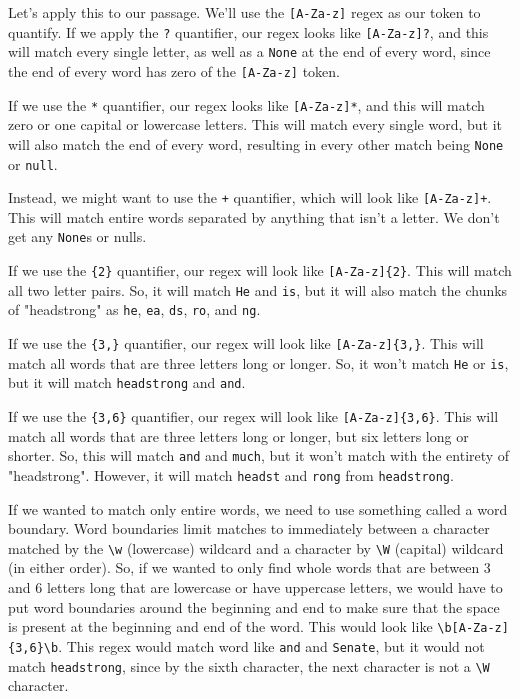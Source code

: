 Let's apply this to our passage. We'll use the \verb|[A-Za-z]| regex as our token to quantify. If we apply the \verb|?| quantifier, our regex looks like \verb|[A-Za-z]?|, and this will match every single letter, as well as a \verb|None| at the end of every word, since the end of every word has zero of the \verb|[A-Za-z]| token.\par 
If we use the \verb|*| quantifier, our regex looks like \verb|[A-Za-z]*|, and this will match zero or one capital or lowercase letters. This will match every single word, but it will also match the end of every word, resulting in every other match being \verb|None| or \verb|null|.\par
Instead, we might want to use the \verb|+| quantifier, which will look like \verb|[A-Za-z]+|. This will match entire words separated by anything that isn't a letter. We don't get any \verb|None|s or nulls.\par
If we use the \verb|{2}| quantifier, our regex will look like \verb|[A-Za-z]{2}|. This will match all two letter pairs. So, it will match \verb|He| and \verb|is|, but it will also match the chunks of "headstrong" as \verb|he|, \verb|ea|, \verb|ds|, \verb|ro|, and \verb|ng|.\par
If we use the \verb|{3,}| quantifier, our regex will look like \verb|[A-Za-z]{3,}|. This will match all words that are three letters long or longer. So, it won't match \verb|He| or \verb|is|, but it will match \verb|headstrong| and \verb|and|.\par
If we use the \verb|{3,6}| quantifier, our regex will look like \verb|[A-Za-z]{3,6}|. This will match all words that are three letters long or longer, but six letters long or shorter. So, this will match \verb|and| and \verb|much|, but it won't match with the entirety of "headstrong". However, it will match \verb|headst| and \verb|rong| from \verb|headstrong|.\par
If we wanted to match only entire words, we need to use something called a word boundary. Word boundaries limit matches to immediately between a character matched by the \verb|\w| (lowercase) wildcard and a character by \verb|\W| (capital) wildcard (in either order). So, if we wanted to only find whole words that are between 3 and 6 letters long that are lowercase or have uppercase letters, we would have to put word boundaries around the beginning and end to make sure that the space is present at the beginning and end of the word. This would look like \verb|\b[A-Za-z]{3,6}\b|. This regex would match word like \verb|and| and \verb|Senate|, but it would not match \verb|headstrong|, since by the sixth character, the next character is not a \verb|\W| character.\par

